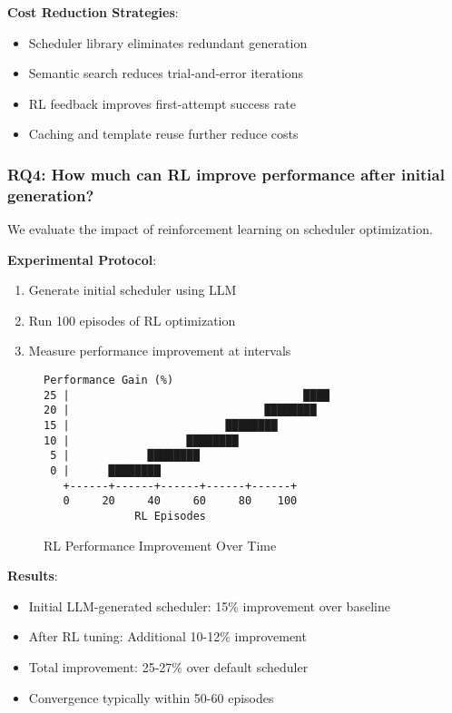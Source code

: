 \textbf{Cost Reduction Strategies}:
\begin{itemize}
\item Scheduler library eliminates redundant generation
\item Semantic search reduces trial-and-error iterations
\item RL feedback improves first-attempt success rate
\item Caching and template reuse further reduce costs
\end{itemize}

\subsubsection{RQ4: How much can RL improve performance after initial generation?}

We evaluate the impact of reinforcement learning on scheduler optimization.

\textbf{Experimental Protocol}:
\begin{enumerate}
\item Generate initial scheduler using LLM
\item Run 100 episodes of RL optimization
\item Measure performance improvement at intervals
\end{enumerate}

\begin{figure}[h]
\centering
\caption{RL Performance Improvement Over Time}
\label{fig:rl-improvement}
\begin{verbatim}
Performance Gain (%)
25 |                                    ████
20 |                              ████████
15 |                        ████████
10 |                  ████████
 5 |            ████████
 0 |      ████████
   +------+------+------+------+------+
   0     20     40     60     80    100
              RL Episodes
\end{verbatim}
\end{figure}

\textbf{Results}:
\begin{itemize}
\item Initial LLM-generated scheduler: 15\% improvement over baseline
\item After RL tuning: Additional 10-12\% improvement
\item Total improvement: 25-27\% over default scheduler
\item Convergence typically within 50-60 episodes
\end{itemize}

